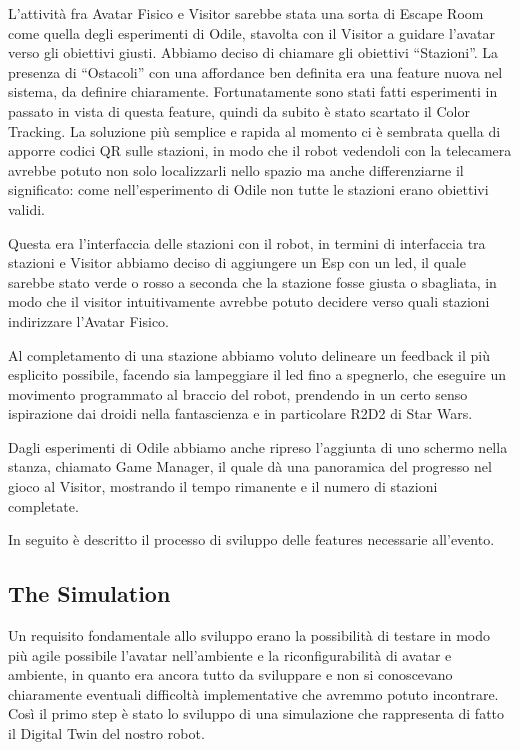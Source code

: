 \documentclass{Configuration_Files/PoliMi3i_thesis}
\begin{document}
L’attività fra Avatar Fisico e Visitor sarebbe stata una sorta di Escape Room come quella degli esperimenti di Odile, stavolta con il Visitor a guidare l’avatar verso gli obiettivi giusti. Abbiamo deciso di chiamare gli obiettivi “Stazioni”. La presenza di “Ostacoli” con una affordance ben definita era una feature nuova nel sistema, da definire chiaramente. Fortunatamente sono stati fatti esperimenti in passato in vista di questa feature, quindi da subito è stato scartato il Color Tracking. La soluzione più semplice e rapida al momento ci è sembrata quella di apporre codici QR sulle stazioni, in modo che il robot vedendoli con la telecamera avrebbe potuto non solo localizzarli nello spazio ma anche differenziarne il significato: come nell’esperimento di Odile non tutte le stazioni erano obiettivi validi.

Questa era l’interfaccia delle stazioni con il robot, in termini di interfaccia tra stazioni e Visitor abbiamo deciso di aggiungere un Esp con un led, il quale sarebbe stato verde o rosso a seconda che la stazione fosse giusta o sbagliata, in modo che il visitor intuitivamente avrebbe potuto decidere verso quali stazioni indirizzare l’Avatar Fisico.

Al completamento di una stazione abbiamo voluto delineare un feedback il più esplicito possibile, facendo sia lampeggiare il led fino a spegnerlo, che eseguire un movimento programmato al braccio del robot, prendendo in un certo senso ispirazione dai droidi nella fantascienza e in particolare R2D2 di Star Wars.

Dagli esperimenti di Odile abbiamo anche ripreso l’aggiunta di uno schermo nella stanza, chiamato Game Manager, il quale dà una panoramica del progresso nel gioco al Visitor, mostrando il tempo rimanente e il numero di stazioni completate.

In seguito è descritto il processo di sviluppo delle features necessarie all’evento.

\subsection{The Simulation}

Un requisito fondamentale allo sviluppo erano la possibilità di testare in modo più agile possibile l’avatar nell’ambiente e la riconfigurabilità di avatar e ambiente, in quanto era ancora tutto da sviluppare e non si conoscevano chiaramente eventuali difficoltà implementative che avremmo potuto incontrare. Così il primo step è stato lo sviluppo di una simulazione che rappresenta di fatto il Digital Twin del nostro robot.
\end{document}
